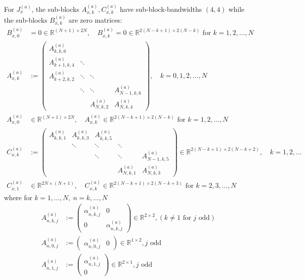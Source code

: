 \documentclass[11pt, oneside]{article}   	%
\newcommand{\R}{\mathbb{R}}
\newcommand{\alphaa}{\alpha^{(a)}}
\begin{document}
For $J_x^{(a)}$, the sub-blocks $A^{(a)}_{x, k}, C^{(a)}_{x, k}$ have sub-block-bandwidths $(4,4)$ while the sub-blocks $B^{(a)}_{x,k}$ are zero matrices:
\begin{align*}
	B^{(a)}_{x,0} &= 0 \in \R^{(N+1)\times2N}, \quad B^{(a)}_{x,k} = 0 \in \R^{2(N-k+1)\times2(N-k)} \text{ for } k = 1,2,\dots,N \\
	A^{(a)}_{x,k} &:= 
		\begin{pmatrix}
			A^{(a)}_{k,k,6} & & & \\
			A^{(a)}_{k+1,k,4} & \ddots & & \\
			A^{(a)}_{k+2,k,2} & \ddots & \ddots & \\
			& \ddots & \ddots & A^{(a)}_{N-1,k,6} \\
			& & A^{(a)}_{N,k,2} & A^{(a)}_{N,k,4}
		\end{pmatrix}, \quad k = 0,1,2,\dots,N \\
	A^{(a)}_{x,0} &\in \R^{(N+1)\times2N}, \quad A^{(a)}_{x,k} \in \R^{2(N-k+1)\times2(N-k)} \text{ for } k = 1,2,\dots,N \\
	C^{(a)}_{x,k} &:= 
		\begin{pmatrix}
			A^{(a)}_{k,k,1} & A^{(a)}_{k,k,3} & A^{(a)}_{k,k,5} & & \\
			& \ddots & \ddots & \ddots \\
			& & \ddots & \ddots & A^{(a)}_{N-1,k,5} \\
			& & & A^{(a)}_{N,k,1} & A^{(a)}_{N,k,3}
		\end{pmatrix} \in \R^{2(N-k+1)\times2(N-k+2)}, \quad k = 1,2,\dots \\
	C^{(a)}_{x,1} &\in \R^{2N\times(N+1)}, \quad C^{(a)}_{x,k} \in \R^{2(N-k+1)\times2(N-k+3)} \text{ for } k = 2,3,\dots,N
\end{align*}
where for $k = 1,\dots,N, \: n = k,\dots,N$
\begin{align}
	A^{(a)}_{n,k,j} &:= 
		\begin{pmatrix}
			\alphaa_{n,k,j} & 0 \\
			0 & \alphaa_{n,k,j}
		\end{pmatrix} \in \R^{2\times2}, (k \ne 1 \text { for } j \text{ odd}) \label{eqn:jacobisubblocksA1} \\
	A^{(a)}_{n,0,j} &:=
		\begin{pmatrix}
			\alphaa_{n,0,j} & 0
		\end{pmatrix} \in \R^{1\times2}, j \text{ odd} \label{eqn:jacobisubblocksA2} \\
	A^{(a)}_{n,1,j} &:=
		\begin{pmatrix}
			\alphaa_{n,1,j} \\
			0
		\end{pmatrix} \in \R^{2\times1}, j \text{ odd} \label{eqn:jacobisubblocksA3} \\
\end{align}
\end{document}
